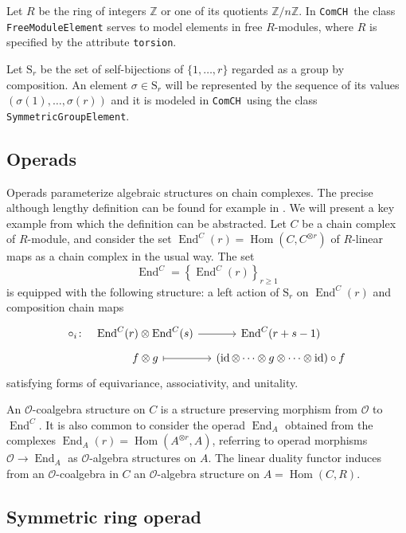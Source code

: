 \documentclass{amsart}
\renewcommand{\S}{\mathrm{S}}
\newcommand{\comch}{\texttt{ComCH}}
\DeclareMathOperator{\id}{id}
\DeclareMathOperator{\Hom}{Hom}
\DeclareMathOperator{\End}{End}
\begin{document}
Let $R$ be the ring of integers $\mathbb Z$ or one of its quotients $\mathbb Z / n \mathbb Z$.
In \comch\, the class \texttt{FreeModuleElement} serves to model elements in free $R$-modules, where $R$ is specified by the attribute \texttt{torsion}.

Let $\S_r$ be the set of self-bijections of $\{1, \dots, r\}$ regarded as a group by composition.
An element $\sigma \in \S_r$ will be represented by the sequence of its values $(\sigma(1), \dots, \sigma(r))$ and it is modeled in \comch\, using the class \texttt{SymmetricGroupElement}.

\subsection{Operads}

Operads parameterize algebraic structures on chain complexes.
The precise although lengthy definition can be found for example in \cite{Markl08}.
We will present a key example from which the definition can be abstracted.
Let $C$ be a chain complex of $R$-module, and consider the set $\End^C(r) =  \Hom(C, C^{\otimes r})$ of $R$-linear maps as a chain complex in the usual way.
The set
\begin{equation*}
\End^C = \left\{\End^C(r)\right\}_{r \geq 1}
\end{equation*}
is equipped with the following structure: a left action of $\S_r$ on $\End^C(r)$ and composition chain maps
\begin{equation*}
\begin{tikzcd}[column sep=small, row sep=tiny]
\circ_i \colon &[-10pt] \End^C(r) \otimes \End^C(s) \arrow[r] & \End^C(r+s-1) \\
& f \otimes g \arrow[r, |->] & (\id \otimes \cdots \otimes g \otimes \cdots \otimes \id) \circ f
\end{tikzcd}
\end{equation*}
satisfying forms of equivariance, associativity, and unitality.

An $\mathcal O$-coalgebra structure on $C$ is a structure preserving morphism from $\mathcal O$ to $\End^C$.
It is also common to consider the operad $\End_A$ obtained from the complexes $\End_A(r) =  \Hom(A^{\otimes r}, A)$, referring to operad morphisms $\mathcal O \to \End_A$ as $\mathcal O$-algebra structures on $A$.
The linear duality functor induces from an $\mathcal O$-coalgebra in $C$ an $\mathcal O$-algebra structure on $A = \Hom(C, R)$.

\subsection{Symmetric ring operad}
\end{document}
